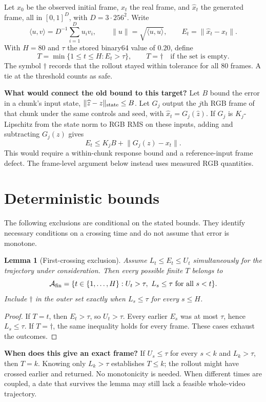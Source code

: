 \documentclass[11pt]{article}
\theoremstyle{noteplain}
\newtheorem{lemma}{Lemma}
\newcommand{\norm}[1]{\lVert #1\rVert}
\newcommand{\ip}[2]{\langle #1,#2\rangle}
\newcommand{\dates}[2]{\{#1,\ldots,#2\}}
\newcommand{\dd}{\dagger}
\begin{document}
Let $x_0$ be the observed initial frame, $x_t$ the real frame, and $\widehat x_t$ the generated frame, all in $[0,1]^D$, with $D=3\cdot256^2$. Write
\[
 \ip{u}{v}=D^{-1}\sum_{i=1}^D u_i v_i,\qquad
 \norm{u}=\sqrt{\ip{u}{u}},\qquad E_t=\norm{\widehat x_t-x_t}.
\]
With $H=80$ and $\tau$ the stored binary64 value of $0.20$, define
\[
 T=\min\{1\le t\le H:E_t>\tau\},
 \qquad T=\dd\quad\text{if the set is empty}.
\]
The symbol $\dd$ records that the rollout stayed within tolerance for all 80 frames. A tie at the threshold counts as safe.

\textbf{What would connect the old bound to this target?}
Let $B$ bound the error in a chunk's input state, $\norm{\widehat z-z}_{\rm state}\le B$. Let $G_j$ output the $j$th RGB frame of that chunk under the same controls and seed, with $\widehat x_t=G_j(\widehat z)$. If $G_j$ is $K_j$-Lipschitz from the state norm to RGB RMS on these inputs, adding and subtracting $G_j(z)$ gives
\[
 E_t\le K_j B+\norm{G_j(z)-x_t}.
\]
This would require a within-chunk response bound and a reference-input frame defect. The frame-level argument below instead uses measured RGB quantities.

\section{Deterministic bounds}\label{sec:deterministic}
The following exclusions are conditional on the stated bounds. They identify necessary conditions on a crossing time and do not assume that error is monotone.

\begin{lemma}[First-crossing exclusion]\label{lem:exclude}
Assume $L_t\le E_t\le U_t$ simultaneously for the trajectory under consideration. Then every possible finite $T$ belongs to
\[
 \mathcal A_{\rm fin}=\{t\in\dates{1}{H}:U_t>\tau,\ L_s\le\tau\ \text{for all }s<t\}.
\]
Include $\dd$ in the outer set exactly when $L_s\le\tau$ for every $s\le H$.
\end{lemma}
\begin{proof}
If $T=t$, then $E_t>\tau$, so $U_t>\tau$. Every earlier $E_s$ was at most $\tau$, hence $L_s\le\tau$. If $T=\dd$, the same inequality holds for every frame. These cases exhaust the outcomes.
\end{proof}

\textbf{When does this give an exact frame?} If $U_s\le\tau$ for every $s<k$ and $L_k>\tau$, then $T=k$. Knowing only $L_k>\tau$ establishes $T\le k$; the rollout might have crossed earlier and returned. No monotonicity is needed. When different times are coupled, a date that survives the lemma may still lack a feasible whole-video trajectory.
\end{document}

